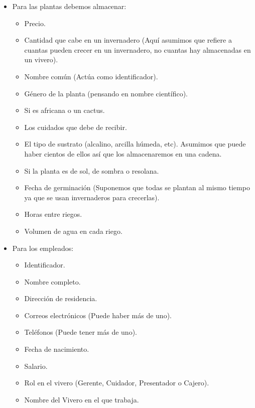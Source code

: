 \documentclass[12pt,a4paper]{article}
\begin{document}
\begin{itemize}
	\item Para las plantas debemos almacenar:\\
		\begin{itemize}
			\item Precio.\\
			\item Cantidad que cabe en un invernadero
				(Aquí asumimos que refiere a cuantas pueden crecer en un invernadero,
				no cuantas hay almacenadas en un vivero).\\
			\item Nombre común (Actúa como identificador).\\
			\item Género de la planta (pensando en nombre científico).\\
			\item Si es africana o un cactus.\\
			\item Los cuidados que debe de recibir.\\
			\item El tipo de sustrato (alcalino, arcilla húmeda, etc).
				Asumimos que puede haber cientos de ellos así que los
				almacenaremos en una cadena.\\
			\item Si la planta es de sol, de sombra o resolana.\\
			\item Fecha de germinación (Suponemos que todas se plantan al mismo tiempo
				ya que se usan invernaderos para crecerlas).\\
			\item Horas entre riegos.\\
			\item Volumen de agua en cada riego.\\
		\end{itemize}
		
	\item Para los empleados:\\
		\begin{itemize}
			\item Identificador.\\
			\item Nombre completo.\\
			\item Dirección de residencia.\\
			\item Correos electrónicos (Puede haber más de uno).\\
			\item Teléfonos (Puede tener más de uno).\\
			\item Fecha de nacimiento.\\
			\item Salario.\\
			\item Rol en el vivero (Gerente, Cuidador, Presentador o Cajero).\\
			\item Nombre del Vivero en el que trabaja.\\
		\end{itemize}


\end{itemize}
\end{document}
